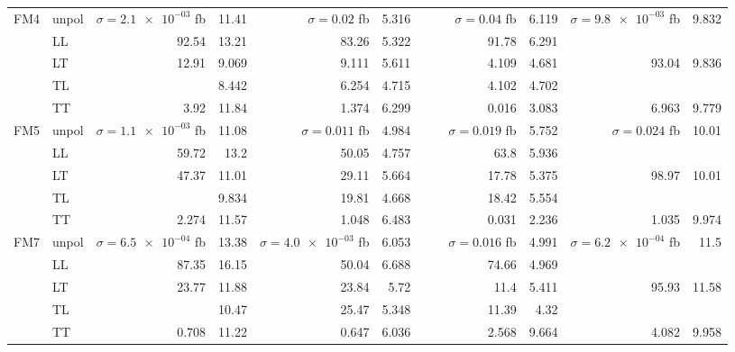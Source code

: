 \begin{table}[h]
{\begin{tabular}{llrrrrrrrrrr}
\midrule
\multirow{5}{*}{FM4}
 & unpol & $\sigma = \num{2.1e-03}$ fb & \num{11.41} & $\sigma = \num{0.02}$ fb & \num{5.316} &  &  & $\sigma = \num{0.04}$ fb & \num{6.119} & $\sigma = \num{9.8e-03}$ fb & \num{9.832} \\
 & LL & \num{92.54} & \num{13.21} & \num{83.26} & \num{5.322} &  &  & \num{91.78} & \num{6.291} &  &  \\
 & LT & \num{12.91} & \num{9.069} & \num{9.111} & \num{5.611} &  &  & \num{4.109} & \num{4.681} & \num{93.04} & \num{9.836} \\
 & TL &  & \num{8.442} & \num{6.254} & \num{4.715} &  &  & \num{4.102} & \num{4.702} &  &  \\
 & TT & \num{3.92} & \num{11.84} & \num{1.374} & \num{6.299} &  &  & \num{0.016} & \num{3.083} & \num{6.963} & \num{9.779} \\
\midrule
\multirow{5}{*}{FM5}
 & unpol & $\sigma = \num{1.1e-03}$ fb & \num{11.08} & $\sigma = \num{0.011}$ fb & \num{4.984} &  &  & $\sigma = \num{0.019}$ fb & \num{5.752} & $\sigma = \num{0.024}$ fb & \num{10.01} \\
 & LL & \num{59.72} & \num{13.2} & \num{50.05} & \num{4.757} &  &  & \num{63.8} & \num{5.936} &  &  \\
 & LT & \num{47.37} & \num{11.01} & \num{29.11} & \num{5.664} &  &  & \num{17.78} & \num{5.375} & \num{98.97} & \num{10.01} \\
 & TL &  & \num{9.834} & \num{19.81} & \num{4.668} &  &  & \num{18.42} & \num{5.554} &  &  \\
 & TT & \num{2.274} & \num{11.57} & \num{1.048} & \num{6.483} &  &  & \num{0.031} & \num{2.236} & \num{1.035} & \num{9.974} \\
\midrule
\multirow{5}{*}{FM7}
 & unpol & $\sigma = \num{6.5e-04}$ fb & \num{13.38} & $\sigma = \num{4.0e-03}$ fb & \num{6.053} &  &  & $\sigma = \num{0.016}$ fb & \num{4.991} & $\sigma = \num{6.2e-04}$ fb & \num{11.5} \\
 & LL & \num{87.35} & \num{16.15} & \num{50.04} & \num{6.688} &  &  & \num{74.66} & \num{4.969} &  &  \\
 & LT & \num{23.77} & \num{11.88} & \num{23.84} & \num{5.72} &  &  & \num{11.4} & \num{5.411} & \num{95.93} & \num{11.58} \\
 & TL &  & \num{10.47} & \num{25.47} & \num{5.348} &  &  & \num{11.39} & \num{4.32} &  &  \\
 & TT & \num{0.708} & \num{11.22} & \num{0.647} & \num{6.036} &  &  & \num{2.568} & \num{9.664} & \num{4.082} & \num{9.958} \\

\end{tabular}}
\end{table}
